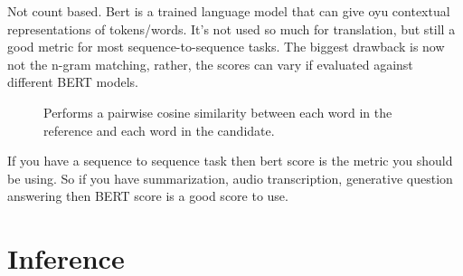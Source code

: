 \documentclass[11pt]{article}
\begin{document}
Not count based. Bert is a trained language model that can give oyu contextual representations of tokens/words. It's not used so much for translation, but still a good metric for most sequence-to-sequence tasks. The biggest drawback is now not the n-gram matching, rather, the scores can vary if evaluated against different BERT models.

\begin{figure}[H]
    \centering
    \caption*{Performs a pairwise cosine similarity between each word in the reference and each word in the candidate.}
\end{figure}

If you have a sequence to sequence task then bert score is the metric you should be using. So if you have summarization, audio transcription, generative question answering then BERT score is a good score to use.

\section{Inference}
\end{document}
